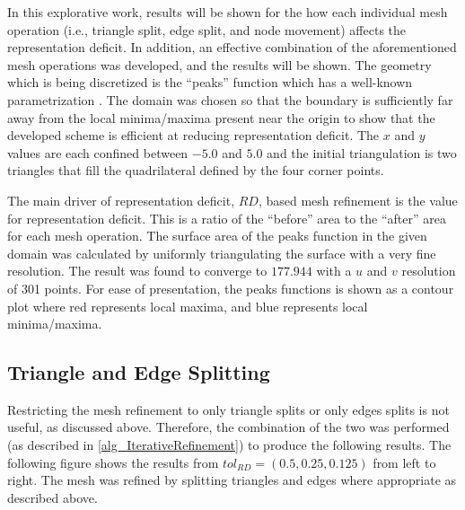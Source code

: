 In this explorative work, results will be shown for the how each
individual mesh operation (i.e., triangle split, edge split, and node 
movement) affects the representation deficit. In addition, an effective
combination of the aforementioned mesh operations was developed, and the
results will be shown. The geometry which is being discretized is the
``peaks'' function which has a well-known parametrization
\cite{peaksMatlab}. The domain was chosen so that the boundary is
sufficiently far away from the local minima/maxima present near the origin to
show that the developed scheme is efficient at reducing representation
deficit. The $x$ and $y$ values are each confined between $-5.0$ and
$5.0$ and the initial triangulation is two triangles that fill the
quadrilateral defined by the four corner points.

The main driver of representation deficit, $RD$, based mesh refinement
is the value for representation deficit. This is a ratio of the
``before'' area to the ``after'' area for each mesh operation. The
surface area of the peaks function in the given domain was calculated by
uniformly triangulating the surface with a very fine resolution. The
result was found to converge to $177.944$ with a $u$ and $v$ resolution
of 301 points. For ease of presentation, the peaks functions is shown as
a contour plot where red represents local maxima, and blue represents
local minima/maxima.

\subsection{Triangle and Edge Splitting}
Restricting the mesh refinement to only triangle splits or only edges
splits is not useful, as discussed above. Therefore, the combination of
the two was performed (as described in \ref{alg_IterativeRefinement})
to produce the following results. The following figure shows the results
from $tol_{RD}=\left(0.5,0.25,0.125\right)$ from left to right. The mesh was
refined by splitting triangles and edges where appropriate as described
above.

